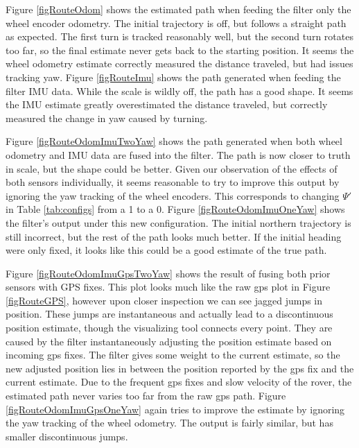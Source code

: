 Figure \ref{figRouteOdom} shows the estimated path when feeding the filter only the wheel encoder odometry. The initial trajectory is off, but follows a straight path as expected. The first turn is tracked reasonably well, but the second turn rotates too far, so the final estimate never gets back to the starting position. It seems the wheel odometry estimate correctly measured the distance traveled, but had issues tracking yaw. Figure \ref{figRouteImu} shows the path generated when feeding the filter IMU data. While the scale is wildly off, the path has a good shape. It seems the IMU estimate greatly overestimated the distance traveled, but correctly measured the change in yaw caused by turning.

Figure \ref{figRouteOdomImuTwoYaw} shows the path generated when both wheel odometry and IMU data are fused into the filter. The path is now closer to truth in scale, but the shape could be better. Given our observation of the effects of both sensors individually, it seems reasonable to try to improve this output by ignoring the yaw tracking of the wheel encoders. This corresponds to changing \(\Psi'\) in Table \ref{tab:configs} from a 1 to a 0. Figure \ref{figRouteOdomImuOneYaw} shows the filter's output under this new configuration. The initial northern trajectory is still incorrect, but the rest of the path looks much better. If the initial heading were only fixed, it looks like this could be a good estimate of the true path.


Figure \ref{figRouteOdomImuGpsTwoYaw} shows the result of fusing both prior sensors with GPS fixes. This plot looks much like the raw gps plot in Figure \ref{figRouteGPS}, however upon closer inspection we can see jagged jumps in position. These jumps are instantaneous and actually lead to a discontinuous position estimate, though the visualizing tool connects every point. They are caused by the filter instantaneously adjusting the position estimate based on incoming gps fixes. The filter gives some weight to the current estimate, so the new adjusted position lies in between the position reported by the gps fix and the current estimate. Due to the frequent gps fixes and slow velocity of the rover, the estimated path never varies too far from the raw gps path. Figure \ref{figRouteOdomImuGpsOneYaw} again tries to improve the estimate by ignoring the yaw tracking of the wheel odometry. The output is fairly similar, but has smaller discontinuous jumps.

